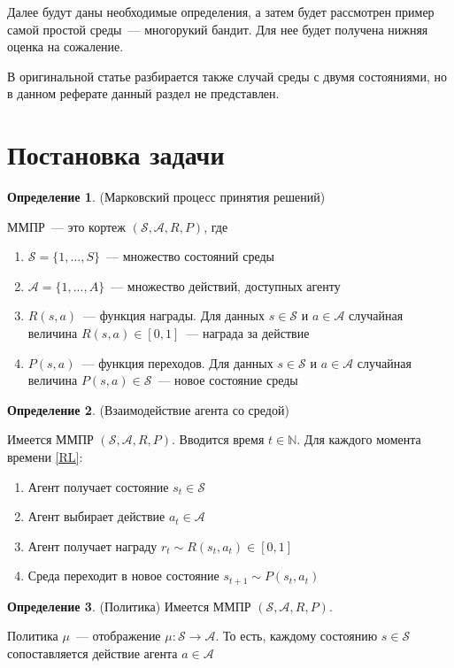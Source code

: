 \documentclass[a4paper]{article}
\newcommand{\N}{\mathbb{N}}
\newcommand{\Ss}{\mathcal{S}}
\newcommand{\A}{\mathcal{A}}
\begin{document}
Далее будут даны необходимые определения, а затем будет рассмотрен пример самой простой среды~--- многорукий бандит. Для нее будет получена нижняя оценка на сожаление.

В оригинальной статье разбирается также случай среды с двумя состояниями, но в данном реферате данный раздел не представлен.

\section{Постановка задачи}

\theoremstyle{definition}
\newtheorem{definition}{Определение}[section]
\newtheorem{lemma}{Лемма}[section]
\newtheorem{theorem}{Теорема}[section]
\begin{definition}{(Марковский процесс принятия решений)}
	
ММПР~--- это кортеж $(\mathcal{S}, \mathcal{A}, R, P)$, где
\begin{enumerate}
	\item $\mathcal{S}=\{1,...,S\}$~--- множество состояний среды
	\item $\mathcal{A}=\{1,...,A\}$~--- множество действий, доступных агенту
	\item $R(s,a)$~--- функция награды. Для данных $s\in \Ss$ и $a\in\A$ случайная величина $R(s, a)\in[0,1]$~--- награда за действие
	\item $P(s,a)$~--- функция переходов. Для данных $s\in \Ss$ и $a\in\A$ случайная величина $P(s, a)\in\Ss$~--- новое состояние среды
\end{enumerate}
\end{definition}

\begin{definition}{(Взаимодействие агента со средой)}

Имеется ММПР $(\Ss,\A,R,P)$. Вводится время $t\in\N$. Для каждого момента времени \ref{RL}:
\begin{enumerate}
\item Агент получает состояние $s_t\in \Ss$
\item Агент выбирает действие $a_t\in\A$
\item Агент получает награду $r_t\sim R(s_t,a_t)\in[0,1]$
\item Среда переходит в новое состояние $s_{t+1}\sim P(s_t,a_t)$
\end{enumerate}
\end{definition}

\begin{definition}{(Политика)}
Имеется ММПР $(\Ss,\A,R,P)$.

Политика $\mu$~--- отображение $\mu\colon \Ss\to\A$. То есть, каждому состоянию $s\in\Ss$ сопоставляется действие агента $a\in\A$
\end{definition}
\end{document}
